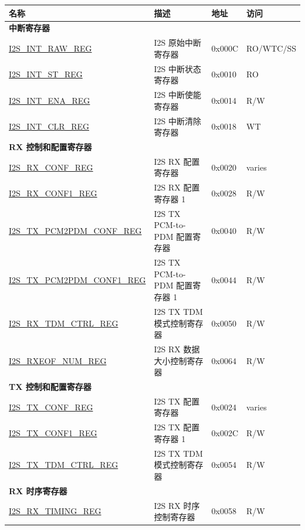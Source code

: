 \begin{longtable}{ | p{6cm} | p{6.2cm} | p{1.3cm} | p{2cm} | }
\hline\rowcolor{lightgray}
\textbf{名称} & \textbf{描述} &  \textbf{地址} & \textbf{访问} \\ \hline
\endhead
\multicolumn{4}{|l|}{\textbf{中断寄存器}} \\ \hline
\hyperref[regdesc:I2SINTRAWREG]{I2S\_INT\_RAW\_REG} & I2S 原始中断寄存器 & 0x000C & RO/WTC/SS \\ \hline
\hyperref[regdesc:I2SINTSTREG]{I2S\_INT\_ST\_REG} & I2S 中断状态寄存器 & 0x0010 & RO \\ \hline
\hyperref[regdesc:I2SINTENAREG]{I2S\_INT\_ENA\_REG} & I2S 中断使能寄存器 & 0x0014 & R/W \\ \hline
\hyperref[regdesc:I2SINTCLRREG]{I2S\_INT\_CLR\_REG} & I2S 中断清除寄存器 & 0x0018 & WT \\ \hline
\multicolumn{4}{|l|}{\textbf{RX 控制和配置寄存器}} \\ \hline
\hyperref[regdesc:I2SRXCONFREG]{I2S\_RX\_CONF\_REG} & I2S RX 配置寄存器 & 0x0020 & varies \\ \hline
\hyperref[regdesc:I2SRXCONF1REG]{I2S\_RX\_CONF1\_REG} & I2S RX 配置寄存器 1 & 0x0028 & R/W \\ \hline
\hyperref[regdesc:I2STXPCM2PDMCONFREG]{I2S\_TX\_PCM2PDM\_CONF\_REG} & I2S TX PCM-to-PDM 配置寄存器 & 0x0040 & R/W \\ \hline
\hyperref[regdesc:I2STXPCM2PDMCONF1REG]{I2S\_TX\_PCM2PDM\_CONF1\_REG} & I2S TX PCM-to-PDM 配置寄存器 1 & 0x0044 & R/W \\ \hline
\hyperref[regdesc:I2SRXTDMCTRLREG]{I2S\_RX\_TDM\_CTRL\_REG} & I2S TX TDM 模式控制寄存器 & 0x0050 & R/W \\ \hline
\hyperref[regdesc:I2SRXEOFNUMREG]{I2S\_RXEOF\_NUM\_REG} & I2S RX 数据大小控制寄存器 & 0x0064 & R/W \\ \hline
\multicolumn{4}{|l|}{\textbf{TX 控制和配置寄存器}} \\ \hline
\hyperref[regdesc:I2STXCONFREG]{I2S\_TX\_CONF\_REG} & I2S TX 配置寄存器 & 0x0024 & varies \\ \hline
\hyperref[regdesc:I2STXCONF1REG]{I2S\_TX\_CONF1\_REG} & I2S TX 配置寄存器 1 & 0x002C & R/W \\ \hline
\hyperref[regdesc:I2STXTDMCTRLREG]{I2S\_TX\_TDM\_CTRL\_REG} & I2S TX TDM 模式控制寄存器 & 0x0054 & R/W \\ \hline
\multicolumn{4}{|l|}{\textbf{RX 时序寄存器}} \\ \hline
\hyperref[regdesc:I2SRXTIMINGREG]{I2S\_RX\_TIMING\_REG} & I2S RX 时序控制寄存器 & 0x0058 & R/W \\ \hline

\end{longtable}
